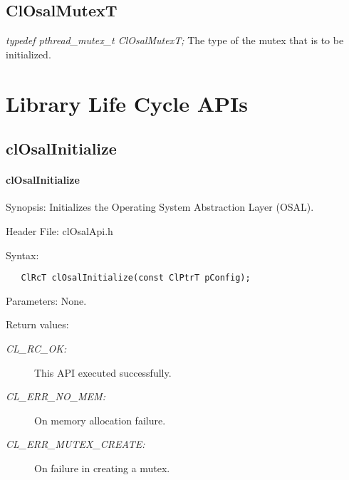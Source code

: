\subsection{ClOsalMutexT}
\textit{typedef pthread\_\-mutex\_\-t ClOsalMutexT;}
\newline
\newline
The type of the mutex that is to be initialized.
\newpage

\section{Library Life Cycle APIs}
\subsection{clOsalInitialize}
\hypertarget{pageosal101}{}\paragraph{cl\-Osal\-Initialize}\label{pageosal101}
\begin{Desc}
\item[Synopsis:]Initializes the Operating System Abstraction Layer (OSAL).\end{Desc}
\begin{Desc}
\item[Header File:]clOsalApi.h\end{Desc}
\begin{Desc}
\item[Syntax:]

\footnotesize\begin{verbatim}   ClRcT clOsalInitialize(const ClPtrT pConfig);
\end{verbatim}
\normalsize
\end{Desc}
\begin{Desc}
\item[Parameters:]None.\end{Desc}
\begin{Desc}
\item[Return values:]
\begin{description}
\item[{\em CL\_\-RC\_\-OK:}]This API executed successfully. \item[{\em CL\_\-ERR\_\-NO\_\-MEM:}]On memory allocation failure. \item[{\em CL\_\-ERR\_\-MUTEX\_\-CREATE:}]On failure in creating a mutex.\end{description}
\end{Desc}
